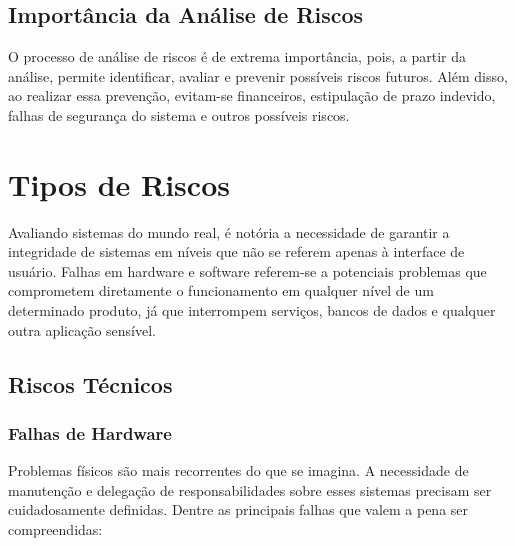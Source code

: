 \documentclass[12pt,oneside,a4paper,article]{abntex2}
\begin{document}
\subsection {Importância da Análise de Riscos}
{O processo de análise de riscos é de extrema importância, pois, a partir da análise, permite identificar, avaliar e prevenir possíveis riscos futuros. Além disso, ao realizar essa prevenção, evitam-se financeiros, estipulação de prazo indevido, falhas de segurança do sistema e outros possíveis riscos.}

\newpage

\section {\textbf{Tipos de Riscos}}

{Avaliando sistemas do mundo real, é notória a necessidade de garantir a integridade de sistemas em níveis que não se referem apenas à interface de usuário. Falhas em hardware e software referem-se a potenciais problemas que comprometem diretamente o funcionamento em qualquer nível de um determinado produto, já que interrompem serviços, bancos de dados e qualquer outra aplicação sensível.}

\subsection{Riscos Técnicos}

\subsubsection{Falhas de Hardware}

Problemas físicos são mais recorrentes do que se imagina. A necessidade de manutenção e delegação de responsabilidades sobre esses sistemas precisam ser cuidadosamente definidas. Dentre as principais falhas que valem a pena ser compreendidas:
\end{document}
